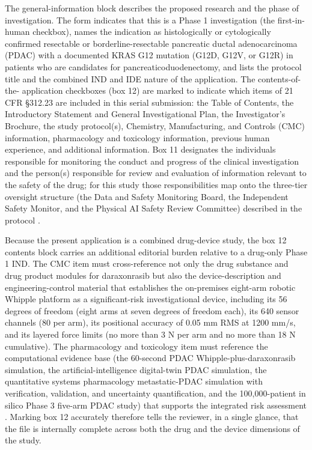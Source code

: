 The general-information block describes the proposed research and the
phase of investigation. The form indicates that this is a Phase 1
investigation (the first-in-human checkbox), names the indication as
histologically or cytologically confirmed resectable or
borderline-resectable pancreatic ductal adenocarcinoma (PDAC) with a
documented KRAS G12 mutation (G12D, G12V, or G12R) in patients who are
candidates for pancreaticoduodenectomy, and lists the protocol title and
the combined IND and IDE nature of the application. The contents-of-the-
application checkboxes (box 12) are marked to indicate which items of 21
CFR \S 312.23 are included in this serial submission: the Table of
Contents, the Introductory Statement and General Investigational Plan, the
Investigator's Brochure, the study protocol(s), Chemistry, Manufacturing,
and Controls (CMC) information, pharmacology and toxicology information,
previous human experience, and additional information. Box 11 designates
the individuals responsible for monitoring the conduct and progress of the
clinical investigation and the person(s) responsible for review and
evaluation of information relevant to the safety of the drug; for this
study those responsibilities map onto the three-tier oversight structure
(the Data and Safety Monitoring Board, the Independent Safety Monitor, and
the Physical AI Safety Review Committee) described in the protocol
\cite{paiautospons, clintrustpai}.

Because the present application is a combined drug-device study, the box 12
contents block carries an additional editorial burden relative to a
drug-only Phase 1 IND. The CMC item must cross-reference not only the drug
substance and drug product modules for daraxonrasib but also the
device-description and engineering-control material that establishes the
on-premises eight-arm robotic Whipple platform as a significant-risk
investigational device, including its 56 degrees of freedom (eight arms at
seven degrees of freedom each), its 640 sensor channels (80 per arm), its
positional accuracy of 0.05 mm RMS at 1200 mm/s, and its layered force
limits (no more than 3 N per arm and no more than 18 N cumulative). The
pharmacology and toxicology item must reference the computational evidence
base (the 60-second PDAC Whipple-plus-daraxonrasib simulation, the
artificial-intelligence digital-twin PDAC simulation, the quantitative
systems pharmacology metastatic-PDAC simulation with verification,
validation, and uncertainty quantification, and the 100,000-patient in
silico Phase 3 five-arm PDAC study) that supports the integrated
risk assessment \cite{fdadigtwinpc, qspmetpancre, chatgpt100kp,
pdacdigtwinp}. Marking box 12 accurately therefore tells the reviewer, in
a single glance, that the file is internally complete across both the drug
and the device dimensions of the study.


